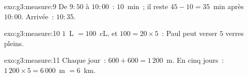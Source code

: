 \begin{solution}{exo:g3:measure:9}
De $9{:}50$ à $10{:}00$~: $10$~min~; il reste
$45 - 10 = 35$~min après $10{:}00$. Arrivée~: $10{:}35$.
\end{solution}

\begin{solution}{exo:g3:measure:10}
$1$~L $= 100$~cL, et $100 = 20 \times 5$~: Paul peut verser $5$
verres pleins.
\end{solution}

\begin{solution}{exo:g3:measure:11}
Chaque jour~: $600 + 600 = 1\,200$~m. En cinq jours~:
$1\,200 \times 5 = 6\,000$~m $= 6$~km.
\end{solution}
